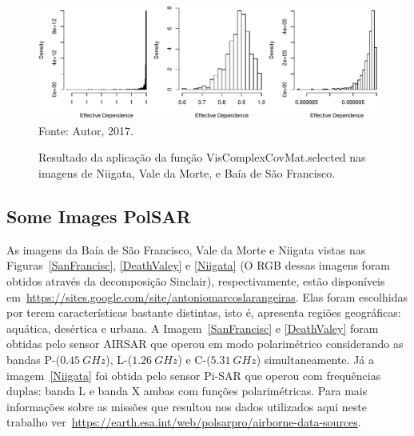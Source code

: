 \documentclass[journal]{IEEEtran}
\begin{document}
\begin{figure}[h]
\centering
\caption{Resultado da aplicação da função VisComplexCovMat.selected nas imagens de Niigata, Vale da Morte, e Baía de São Francisco.}
\includegraphics[width=\linewidth]{../../Figuras/histD_e-Niigata-DeathValey-SanFrancisc-rangedif.pdf}\\
Fonte: Autor, 2017.
\label{comparacao-Niig-Death-San}
\end{figure}  



\subsection{Some Images Pol{SAR}}

As imagens da Baía de São Francisco, Vale da Morte e Niigata vistas nas Figuras~\ref{SanFrancisc}, \ref{DeathValey} e \ref{Niigata} (O RGB dessas imagens foram obtidos através da decomposição Sinclair), respectivamente, estão disponíveis em~\url{https://sites.google.com/site/antoniomarcoslarangeiras}. Elas foram escolhidas por terem características bastante distintas, isto é, apresenta regiões geográficas: aquática, desértica e urbana. A Imagem~\ref{SanFrancisc} e  \ref{DeathValey} foram obtidas pelo sensor AIRSAR que operou em modo polarimétrico considerando as bandas P-($0.45~GHz$), L-($1.26~GHz$) e C-($5.31~GHz$) simultaneamente.  Já a imagem~\ref{Niigata} foi obtida pelo sensor Pi-SAR que operou com frequências duplas: banda L e banda X ambas com funções polarimétricas. Para mais informações sobre as missões que resultou nos dados utilizados aqui neste trabalho ver~\url{https://earth.esa.int/web/polsarpro/airborne-data-sources}. 
\end{document}
